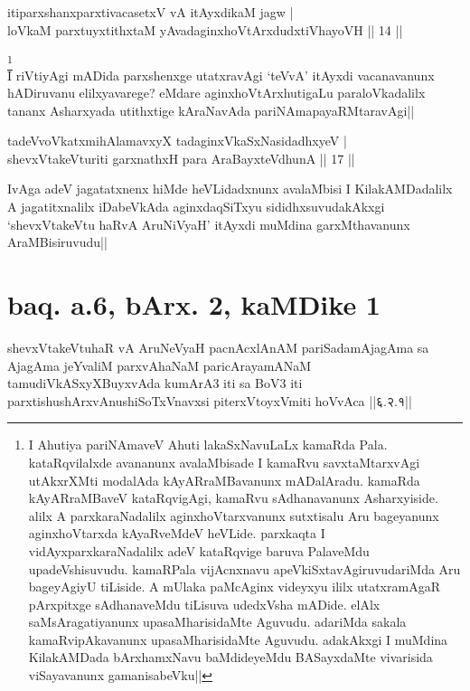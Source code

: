 \begin{shl}
itiparxshanxparxtivacasetxV vA itAyxdikaM jagw | \\
loVkaM parxtuyxtithxtaM yAvadaginxhoVtArxdudxtiVhayoVH \hfill|| 14 || 
\end{shl}

\begin{artha}
\footnote[2]{I Ahutiya pariNAmaveV Ahuti lakaSxNavuLaLx kamaRda Pala. 
kataRqvilalxde avananunx avalaMbisade I kamaRvu savxtaMtarxvAgi 
utAkxrXMti modalAda kAyARraMBavanunx mADalAradu. kamaRda kAyARraMBaveV 
kataRqvigAgi, kamaRvu sAdhanavanunx Asharxyiside. alilx A 
parxkaraNadalilx aginxhoVtarxvanunx sutxtisalu Aru bageyanunx 
aginxhoVtarxda kAyaRveMdeV heVLide. parxkaqta I vidAyxparxkaraNadalilx 
adeV kataRqvige baruva PalaveMdu upadeVshisuvudu. kamaRPala 
vijAcnxnavu apeVkiSxtavAgiruvudariMda Aru bageyAgiyU tiLiside. A 
mUlaka paMcAginx videyxyu ililx utatxramAgaR pArxpitxge sAdhanaveMdu 
tiLisuva udedxVsha mADide. elAlx saMsAragatiyanunx upasaMharisidaMte 
Aguvudu. adariMda sakala kamaRvipAkavanunx upasaMharisidaMte Aguvudu. 
adakAkxgi I muMdina KilakAMDada bArxhamxNavu baMdideyeMdu BASayxdaMte 
vivarisida viSayavanunx gamanisabeVku||}\\
I riVtiyAgi mADida parxshenxge utatxravAgi `teVvA' itAyxdi 
vacanavanunx hADiruvanu elilxyavarege? eMdare aginxhoVtArxhutigaLu 
paraloVkadalilx tananx Asharxyada utithxtige kAraNavAda 
pariNAmapayaRMtaravAgi||
\end{artha}

\begin{shl}
tadeVvoVkatxmihA\s \s lamavxyX tadaginxVkaSxNasidadhxyeV | \\
shevxVtakeVturiti garxnathxH para AraBayxteV\s dhunA \hfill|| 17 || 
\end{shl}

\begin{artha}
IvAga adeV jagatatxnenx hiMde heVLidadxnunx avalaMbisi I 
KilakAMDadalilx A jagatitxnalilx iDabeVkAda aginxdaqSiTxyu 
sididhxsuvudakAkxgi `shevxVtakeVtu haRvA AruNiVyaH' itAyxdi muMdina 
garxMthavanunx AraMBisiruvudu||
\end{artha}

\section*{baq. a.6, bArx. 2, kaMDike 1}

\begin{shl}
shevxVtakeVtuhaR vA AruNeVyaH pacnAcxlAnAM pariSadamAjagAma sa AjagAma jeYvaliM parxvAhaNaM paricArayamANaM tamudiVkASxyXBuyxvAda kumArA3 iti sa BoV3 iti parxtishushArxvAnushiSoTxV\s navxsi piterxVtoyxVmiti hoVvAca ||६.२.१||
\end{shl}

